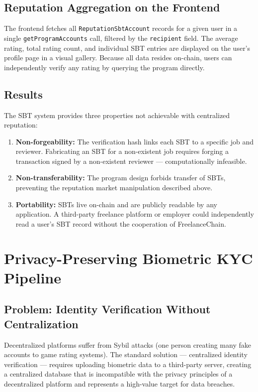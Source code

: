\subsection{Reputation Aggregation on the Frontend}

The frontend fetches all \texttt{ReputationSbtAccount} records for a given user in a single \texttt{getProgramAccounts} call, filtered by the \texttt{recipient} field. The average rating, total rating count, and individual SBT entries are displayed on the user's profile page in a visual gallery. Because all data resides on-chain, users can independently verify any rating by querying the program directly.

\subsection{Results}

The SBT system provides three properties not achievable with centralized reputation:
\begin{enumerate}
    \item \textbf{Non-forgeability:} The verification hash links each SBT to a specific job and reviewer. Fabricating an SBT for a non-existent job requires forging a transaction signed by a non-existent reviewer --- computationally infeasible.
    \item \textbf{Non-transferability:} The program design forbids transfer of SBTs, preventing the reputation market manipulation described above.
    \item \textbf{Portability:} SBTs live on-chain and are publicly readable by any application. A third-party freelance platform or employer could independently read a user's SBT record without the cooperation of FreelanceChain.
\end{enumerate}

\section{Privacy-Preserving Biometric KYC Pipeline}
\label{section:5.3}

\subsection{Problem: Identity Verification Without Centralization}

Decentralized platforms suffer from Sybil attacks (one person creating many fake accounts to game rating systems). The standard solution --- centralized identity verification --- requires uploading biometric data to a third-party server, creating a centralized database that is incompatible with the privacy principles of a decentralized platform and represents a high-value target for data breaches.

